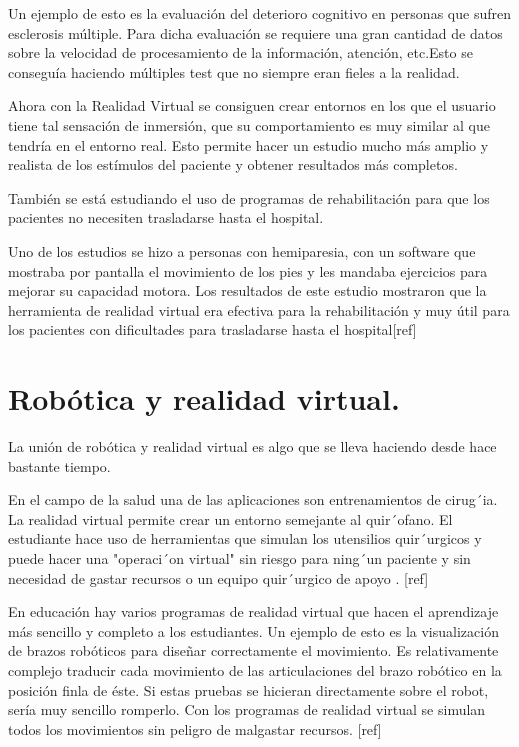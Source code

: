 \documentclass[twoside, 12pt]{epstfg}
\begin{document}
Un ejemplo de esto es la evaluación del deterioro cognitivo en personas que sufren esclerosis múltiple. Para dicha evaluación se requiere una gran cantidad de datos sobre la velocidad de procesamiento de la información, atención, etc.Esto se conseguía haciendo múltiples test que no siempre eran fieles a la realidad.

Ahora con la Realidad Virtual se consiguen crear entornos en los que el usuario tiene tal sensación de inmersión, que su comportamiento es muy similar al que tendría en el entorno real. Esto permite hacer un estudio mucho más amplio y realista de los estímulos del paciente y obtener resultados más completos.\cite{LamargueHamel201594}


También se está estudiando el uso de programas de rehabilitación para que los pacientes no necesiten trasladarse hasta el hospital.

Uno de los estudios se hizo a personas con hemiparesia, con un software que mostraba por pantalla el movimiento de los pies y les mandaba ejercicios para mejorar su capacidad motora. Los resultados de este estudio mostraron que la herramienta de realidad virtual era efectiva para la rehabilitación y muy útil para los pacientes con dificultades para trasladarse hasta el hospital[ref]





\section{Robótica y realidad virtual.} 
\label{sec:robotica y VR}
La unión de robótica y realidad virtual es algo que se lleva haciendo desde hace bastante tiempo.

En el campo de la salud una de las aplicaciones son entrenamientos de cirug´ia. La realidad virtual permite crear un entorno semejante al quir´ofano. El estudiante hace uso de herramientas que simulan los utensilios quir´urgicos y puede hacer una "operaci´on virtual" sin riesgo para ning´un paciente y sin necesidad de gastar recursos o un equipo quir´urgico de apoyo . [ref]

En educación hay varios programas de realidad virtual que hacen el aprendizaje más sencillo y completo a los estudiantes. Un ejemplo de esto es la visualización de brazos robóticos para diseñar correctamente el movimiento.
Es relativamente complejo traducir cada movimiento de las articulaciones del brazo robótico en la posición finla de éste. Si estas pruebas se hicieran directamente sobre el robot, sería muy sencillo romperlo. Con los programas de realidad virtual se simulan todos los movimientos sin peligro de malgastar recursos. [ref]
\end{document}
